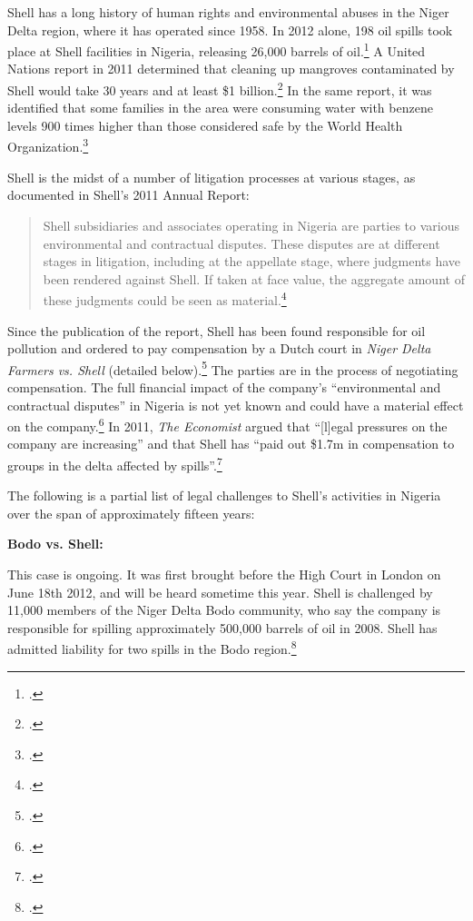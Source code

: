 Shell has a long history of human rights and environmental abuses in the Niger Delta region, where it has operated since 1958.
In 2012 alone, 198 oil spills took place at Shell facilities in Nigeria, releasing 26,000 barrels of oil.\footcite{DutchResponsible}
A United Nations report in 2011 determined that cleaning up mangroves contaminated by Shell would take 30 years and at least \$1 billion.\footcite{Ogoniland}
In the same report, it was identified that some families in the area were consuming water with benzene levels 900 times higher than those considered safe by the World Health Organization.\footcite{OilSpoils}



Shell is the midst of a number of litigation processes at various stages, as documented in Shell's 2011 Annual Report:
\begin{quote}
Shell subsidiaries and associates operating in Nigeria are parties to various environmental and contractual disputes.
These disputes are at different stages in litigation, including at the appellate stage, where judgments have been rendered against Shell. 
If taken at face value, the aggregate amount of these judgments could be seen as material.\footcite[][P.138]{Shell_2011}
\end{quote}
Since the publication of the report, Shell has been found responsible for oil pollution and ordered to pay compensation by a Dutch court in \emph{Niger Delta Farmers vs. Shell} (detailed below).\footcite[See also:][]{DutchResponsible}
The parties are in the process of negotiating compensation.
The full financial impact of the company's ``environmental and contractual disputes'' in Nigeria is not yet known and could have a material effect on the company.\footcite[][p. 139]{Shell_2011}
In 2011, \emph{The Economist} argued that ``[l]egal pressures on the company are increasing'' and that Shell has ``paid out \$1.7m in compensation to groups in the delta affected by spills''.\footcite{OilSpoils}


The following is a partial list of legal challenges to Shell's activities in Nigeria over the span of approximately fifteen years:



\textbf{Bodo vs. Shell:}



This case is ongoing. 
It was first brought before the High Court in London on June 18th 2012, and will be heard sometime this year. 
Shell is challenged by 11,000 members of the Niger Delta Bodo community, who say the company is responsible for spilling approximately 500,000 barrels of oil in 2008. 
Shell has admitted liability for two spills in the Bodo region.\footcite{DutchResponsible}



